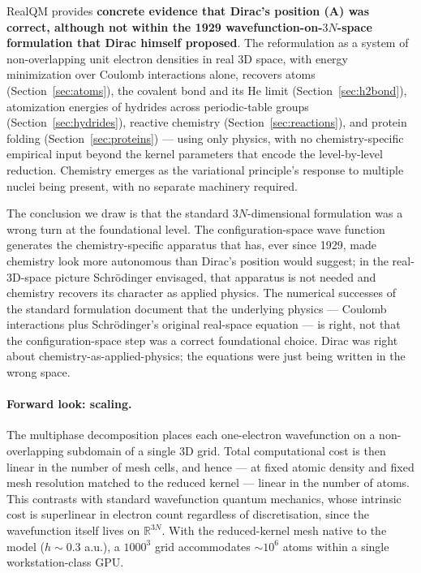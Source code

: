 \documentclass[11pt]{article}
\begin{document}
RealQM provides \textbf{concrete evidence that Dirac's position (A) was correct, although not within the 1929 wavefunction-on-$3N$-space formulation that Dirac himself proposed}. The reformulation as a system of non-overlapping unit electron densities in real 3D space, with energy minimization over Coulomb interactions alone, recovers atoms (Section~\ref{sec:atoms}), the covalent bond and its He limit (Section~\ref{sec:h2bond}), atomization energies of hydrides across periodic-table groups (Section~\ref{sec:hydrides}), reactive chemistry (Section~\ref{sec:reactions}), and protein folding (Section~\ref{sec:proteins}) --- using only physics, with no chemistry-specific empirical input beyond the kernel parameters that encode the level-by-level reduction. Chemistry emerges as the variational principle's response to multiple nuclei being present, with no separate machinery required.

The conclusion we draw is that the standard $3N$-dimensional formulation was a wrong turn at the foundational level. The configuration-space wave function generates the chemistry-specific apparatus that has, ever since 1929, made chemistry look more autonomous than Dirac's position would suggest; in the real-3D-space picture Schr\"odinger envisaged, that apparatus is not needed and chemistry recovers its character as applied physics. The numerical successes of the standard formulation document that the underlying physics --- Coulomb interactions plus Schr\"odinger's original real-space equation --- is right, not that the configuration-space step was a correct foundational choice. Dirac was right about chemistry-as-applied-physics; the equations were just being written in the wrong space.

\paragraph{Forward look: scaling.}
The multiphase decomposition places each one-electron wavefunction on a non-overlapping subdomain of a single 3D grid. Total computational cost is then linear in the number of mesh cells, and hence --- at fixed atomic density and fixed mesh resolution matched to the reduced kernel --- linear in the number of atoms. This contrasts with standard wavefunction quantum mechanics, whose intrinsic cost is superlinear in electron count regardless of discretisation, since the wavefunction itself lives on $\mathbb{R}^{3N}$. With the reduced-kernel mesh native to the model ($h \sim 0.3$ a.u.), a $1000^3$ grid accommodates $\sim 10^6$ atoms within a single workstation-class GPU.
\end{document}
